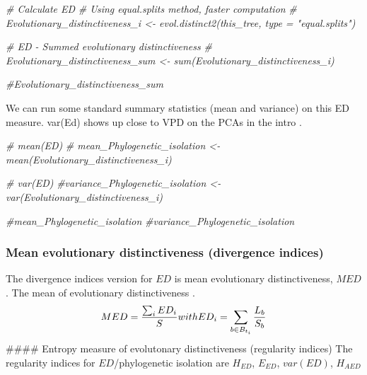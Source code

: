 \documentclass[]{book}
\newenvironment{Shaded}{\begin{snugshade}}{\end{snugshade}}
\newcommand{\CommentTok}[1]{\textcolor[rgb]{0.56,0.35,0.01}{\textit{{#1}}}}
\theoremstyle{definition}
\theoremstyle{definition}
\theoremstyle{remark}
\begin{document}
\begin{Shaded}
\begin{Highlighting}[]
\CommentTok{# Calculate ED}
\CommentTok{# Using equal.splits method, faster computation}
\CommentTok{# Evolutionary_distinctiveness_i <- evol.distinct2(this_tree, type = "equal.splits")  }

\CommentTok{# ED - Summed evolutionary distinctiveness}
\CommentTok{# Evolutionary_distinctiveness_sum <- sum(Evolutionary_distinctiveness_i)}
\end{Highlighting}
\end{Shaded}

\begin{Shaded}
\begin{Highlighting}[]
\CommentTok{#Evolutionary_distinctiveness_sum}
\end{Highlighting}
\end{Shaded}

We can run some standard summary statistics (mean and variance) on this
ED measure. var(Ed) shows up close to VPD on the PCAs in the intro
\citep{Tucker2016}.

\begin{Shaded}
\begin{Highlighting}[]
\CommentTok{# mean(ED)}
\CommentTok{# mean_Phylogenetic_isolation <- mean(Evolutionary_distinctiveness_i)}

\CommentTok{# var(ED)}
\CommentTok{#variance_Phylogenetic_isolation <- var(Evolutionary_distinctiveness_i)}
\end{Highlighting}
\end{Shaded}

\begin{Shaded}
\begin{Highlighting}[]
\CommentTok{#mean_Phylogenetic_isolation}
\CommentTok{#variance_Phylogenetic_isolation}
\end{Highlighting}
\end{Shaded}

\subsubsection{Mean evolutionary distinctiveness (divergence
indices)}\label{mean-evolutionary-distinctiveness-divergence-indices}

The divergence indices version for \(ED\) is mean evolutionary
distinctiveness, \(MED\). The mean of evolutionary distinctiveness
\citep{Redding2003, Isaac2007}. \[
MED = \dfrac
{\sum_{i} ED_{i}}
{S} \\
\ \\
with \\
\ \\
ED_{i} = \sum_{b \in B_{t_{i}}} \dfrac{L_{b}}{S_{b}}
\] \#\#\#\# Entropy measure of evolutonary distinctiveness (regularity
indices) The regularity indices for \(ED\)/phylogenetic isolation are
\(H_{ED}\), \(E_{ED}\), \(var(ED)\), \(H_{AED}\)
\end{document}
